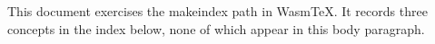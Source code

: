 \documentclass[11pt]{article}
\begin{document}
This document exercises the makeindex path in WasmTeX. It records three concepts
in the index below, none of which appear in this body paragraph.%

\printindex
\end{document}
